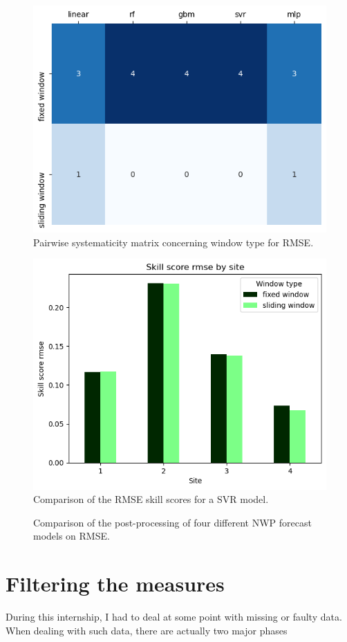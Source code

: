 \begin{figure}[htb!]
    \centering
    \includegraphics[width=\columnwidth]{figures/first_study/comp_window_rmse.png}
\caption{Pairwise systematicity matrix concerning window type for RMSE.}
\end{figure}

\begin{figure}[htb!]
    \centering
    \includegraphics[width=\columnwidth]{figures/first_study/comp_window_rmse_mlp.png}
\caption{Comparison of the RMSE skill scores for a SVR model.}
\end{figure}

\begin{figure}[htb!]
    \centering
    
\caption{Comparison of the post-processing of four different NWP forecast models on RMSE.}
\end{figure}

\section{Filtering the measures}\label{sec:filtering}
During this internship, I had to deal at some point with missing or faulty data.
When dealing with such data, there are actually two major phases